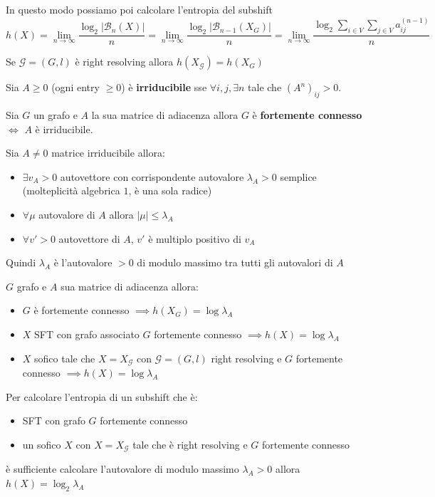 In questo modo possiamo poi calcolare l'entropia del subshift
$$h(X)=\lim_{n\to \infty}\frac{\log_2|\mathcal{B}_n(X)|}{n} = \lim_{n\to \infty}\frac{\log_2|\mathcal{B}_{n-1}(X_G)|}{n} = \lim_{n\to \infty}\frac{\log_2\sum_{i\in V}\sum_{j\in V} a_{ij}^{(n-1)}}{n} $$

\begin{teorema}
    Se $\mathcal{G}= (G,l)$ è right resolving allora $h(X_\mathcal{G}) = h(X_G)$
\end{teorema}

\begin{definizione}
    Sia $A\ge 0$ (ogni entry $\ge 0$) è \textbf{irriducibile} sse $\forall i,j,\exists n$
    tale che $(A^n)_{ij}>0$.
\end{definizione}
\begin{teorema}
    Sia $G$ un grafo e $A$ la sua matrice di adiacenza allora $G$ è \textbf{fortemente
        connesso} $\iff$ $A$ è irriducibile.
\end{teorema}
\begin{teorema} 
    Sia $A\ne 0$ matrice irriducibile allora:
    \begin{itemize}
        \item $\exists v_A>0$ autovettore con corrispondente autovalore $\lambda_A>0$
              semplice (molteplicità algebrica $1$, è una sola radice)
        \item $\forall \mu $ autovalore di $A$ allora $|\mu| \le\lambda_A$
        \item $\forall v'>0$ autovettore di $A$, $v'$ è multiplo positivo di $v_A$
    \end{itemize}
    Quindi $\lambda_A$ è l'autovalore $>0$ di modulo massimo tra tutti gli autovalori
    di $A$
\end{teorema}
\begin{teorema}
    $G$ grafo e $A$ sua matrice di adiacenza allora:
    \begin{itemize}
        \item $G$ è fortemente connesso $\implies h(X_G) = \log\lambda_A$
        \item $X$ SFT con grafo associato $G$ fortemente connesso $\implies h(X) = \log\lambda_A$
        \item $X$ sofico tale che $X=X_\mathcal{G}$ con $\mathcal{G} = (G,l)$ right
              resolving e $G$ fortemente connesso $\implies h(X)=\log \lambda_A$
    \end{itemize}
\end{teorema}
Per calcolare l'entropia di un subshift che è:
\begin{itemize}
    \item SFT con grafo $G$ fortemente connesso
    \item un sofico $X$ con $X=X_\mathcal{G}$ tale che è right resolving e $G$ fortemente
          connesso
\end{itemize}
è sufficiente calcolare l'autovalore di modulo massimo $\lambda_A>0$ allora $h(X)=\log_2\lambda_A$

